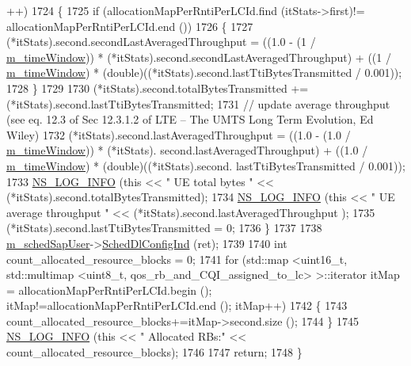\begin{DoxyCode}
      ++)
1724     \{
1725       \textcolor{keywordflow}{if} (allocationMapPerRntiPerLCId.find (itStats->first)!= allocationMapPerRntiPerLCId.end ())
1726         \{
1727           (*itStats).second.secondLastAveragedThroughput = ((1.0 - (1 / 
      \hyperlink{classns3_1_1CqaFfMacScheduler_a2e6951b5a91130305fe3d835bca0f33d}{m\_timeWindow})) * (*itStats).second.secondLastAveragedThroughput) + ((1 / 
      \hyperlink{classns3_1_1CqaFfMacScheduler_a2e6951b5a91130305fe3d835bca0f33d}{m\_timeWindow}) * (double)((*itStats).second.lastTtiBytesTransmitted / 0.001));
1728         \}
1729 
1730       (*itStats).second.totalBytesTransmitted += (*itStats).second.lastTtiBytesTransmitted;
1731       \textcolor{comment}{// update average throughput (see eq. 12.3 of Sec 12.3.1.2 of LTE – The UMTS Long Term Evolution, Ed
       Wiley)}
1732       (*itStats).second.lastAveragedThroughput = ((1.0 - (1.0 / \hyperlink{classns3_1_1CqaFfMacScheduler_a2e6951b5a91130305fe3d835bca0f33d}{m\_timeWindow})) * (*itStats).
      second.lastAveragedThroughput) + ((1.0 / \hyperlink{classns3_1_1CqaFfMacScheduler_a2e6951b5a91130305fe3d835bca0f33d}{m\_timeWindow}) * (double)((*itStats).second.
      lastTtiBytesTransmitted / 0.001));
1733       \hyperlink{group__logging_gafbd73ee2cf9f26b319f49086d8e860fb}{NS\_LOG\_INFO} (\textcolor{keyword}{this} << \textcolor{stringliteral}{" UE total bytes "} << (*itStats).second.totalBytesTransmitted);
1734       \hyperlink{group__logging_gafbd73ee2cf9f26b319f49086d8e860fb}{NS\_LOG\_INFO} (\textcolor{keyword}{this} << \textcolor{stringliteral}{" UE average throughput "} << (*itStats).second.lastAveragedThroughput
      );
1735       (*itStats).second.lastTtiBytesTransmitted = 0;
1736     \}
1737 
1738   \hyperlink{classns3_1_1CqaFfMacScheduler_a42f4b19ce093643c5fa8202ac18ec569}{m\_schedSapUser}->\hyperlink{classns3_1_1FfMacSchedSapUser_a28f8484af5a32a45ee6c0e51770d83f7}{SchedDlConfigInd} (ret);
1739 
1740   \textcolor{keywordtype}{int} count\_allocated\_resource\_blocks = 0;
1741   \textcolor{keywordflow}{for} (std::map <uint16\_t, std::multimap <uint8\_t, qos\_rb\_and\_CQI\_assigned\_to\_lc> >::iterator itMap = 
      allocationMapPerRntiPerLCId.begin (); itMap!=allocationMapPerRntiPerLCId.end (); itMap++)
1742     \{
1743       count\_allocated\_resource\_blocks+=itMap->second.size ();
1744     \}
1745   \hyperlink{group__logging_gafbd73ee2cf9f26b319f49086d8e860fb}{NS\_LOG\_INFO} (\textcolor{keyword}{this} << \textcolor{stringliteral}{" Allocated RBs:"} << count\_allocated\_resource\_blocks);
1746 
1747   \textcolor{keywordflow}{return};
1748 \}
\end{DoxyCode}


